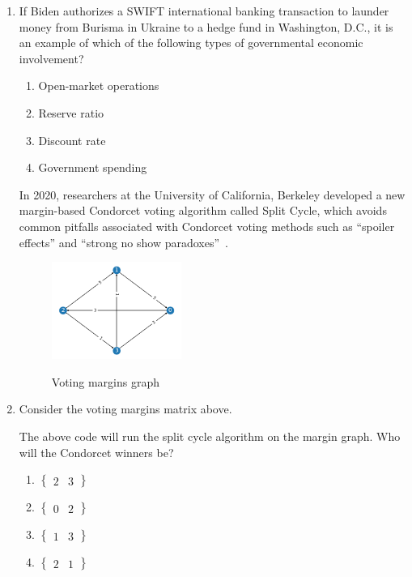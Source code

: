 \begin{enumerate}
  \item If Biden authorizes a \textsc{SWIFT} international banking
        transaction to launder money from Burisma in Ukraine to a hedge
        fund in Washington, D.C., it is an example of which of the
        following types of governmental economic involvement?
        \begin{enumerate}
          \item Open-market operations
          \item Reserve ratio
          \item Discount rate
          \item Government spending
        \end{enumerate}

        \columnbreak
        In 2020, researchers at the University of California, Berkeley
        developed a new margin-based Condorcet voting algorithm called
        Split Cycle, which avoids common pitfalls associated with
        Condorcet voting methods such as ``spoiler effects'' and
        ``strong no show paradoxes''~\cite{splitcycle}.

        \bigskip

        \begin{figure}[h]
          \centering
          \includegraphics[width=0.4\textwidth]{assets/splitcycle.png}
          \label{fig:example}
          \caption{Voting margins graph}
        \end{figure}

  \item Consider the voting margins matrix above.
        

        The above code will run the split cycle algorithm on the margin
        graph. Who will the Condorcet winners be?

        \begin{enumerate}
          \item $\begin{Bmatrix} 2 & 3 \end{Bmatrix}$
          \item $\begin{Bmatrix} 0 & 2 \end{Bmatrix}$
          \item $\begin{Bmatrix} 1 & 3 \end{Bmatrix}$
          \item $\begin{Bmatrix} 2 & 1 \end{Bmatrix}$
        \end{enumerate}
\end{enumerate}